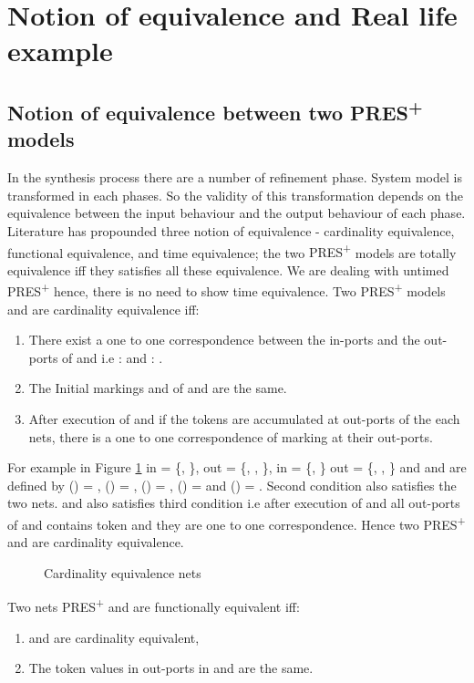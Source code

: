 \documentclass[9pt,executive]{article}
\def\presp{PRES\textsuperscript{+}}
\def\presp{PRES\textsuperscript{+}}
\begin{document}
\section{Notion of equivalence and Real life example} \label{real life example}

\subsection{Notion of equivalence between two {\presp} models}

In the synthesis process there are a  number of refinement phase. System model is transformed in each phases. 
So the validity of this transformation  depends on the equivalence between the input behaviour and the output behaviour of each phase. 
Literature \cite{zebo} has propounded three notion of equivalence - cardinality equivalence, functional equivalence, and time equivalence;
the two {\presp} models are totally equivalence iff they satisfies all these equivalence. We are dealing with untimed {\presp} hence, 
there is no need to show time equivalence.
Two {\presp} models   and  are cardinality equivalence iff:
 \begin{enumerate}
   \item There exist a  one to one correspondence between the in-ports and the out-ports of  and  
      i.e :    and  :   .
   \item The Initial markings  and  of  and  are the same.
   \item After execution of  and  if the tokens are accumulated at out-ports of the each nets, there is 
         a one to one correspondence of marking at their out-ports. 
 \end{enumerate}
 For example in  Figure \ref{fig:n} in = \{, \}, out = \{, , \}, 
in = \{, \} out = \{, , \} and  and  are defined by
() = , () = , () = , () =  and () = .
Second condition also satisfies the two nets.  and  also satisfies third condition i.e after execution of  and  
all out-ports of  and  contains token and they are one to one correspondence. Hence two {\presp}  and  are cardinality 
equivalence. 
 \begin{figure}[htbp]
\centerline{}
\caption{Cardinality equivalence nets}
\label{fig:n}
\end{figure}
 
 Two nets {\presp}  and  are functionally equivalent iff:
\begin{enumerate}
 \item  and  are cardinality equivalent,
 \item The token values in out-ports in  and  are the same.
\end{enumerate}
 
\end{document}
